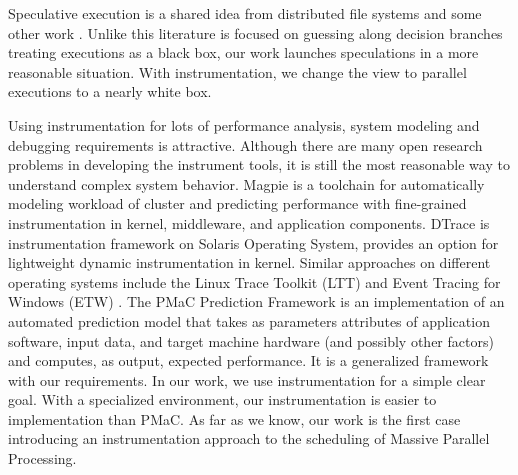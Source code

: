 Speculative execution is a shared idea from distributed file systems \cite{nightingale_speculative_2006} and some other work \cite{su_autobash:_2007} . Unlike this literature is focused on guessing along decision branches treating executions as a black box, our work launches speculations in a more reasonable situation. With instrumentation, we change the view to parallel executions to a nearly white box.

Using instrumentation for lots of performance analysis, system modeling and debugging requirements is attractive. Although there are many open research problems in developing the instrument tools, it is still the most reasonable way to understand complex system behavior. Magpie \cite{barham_using_2004} is a toolchain for automatically modeling workload of cluster and predicting performance with fine-grained instrumentation in kernel, middleware, and application components. DTrace \cite{cantrill_dynamic_2004} is instrumentation framework on Solaris Operating System, provides an option for lightweight dynamic instrumentation in kernel. Similar approaches on different operating systems include the Linux Trace Toolkit (LTT) \cite{yaghmour_measuring_2000} and Event Tracing for Windows (ETW) \cite{_event_2002}. The PMaC Prediction Framework \cite{_pmac_????} is an implementation of an automated prediction model that takes as parameters attributes of application software, input data, and target machine hardware (and possibly other factors) and computes, as output, expected performance. It is a generalized framework with our requirements. In our work, we use instrumentation for a simple clear goal. With a specialized environment, our instrumentation is easier to implementation than PMaC. As far as we know, our work is the first case introducing an instrumentation approach to the scheduling of Massive Parallel Processing.

